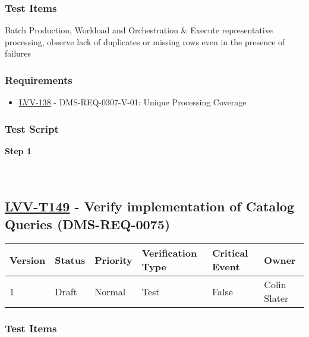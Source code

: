 \hypertarget{test-items-124}{%
\subsubsection{Test Items}\label{test-items-124}}

Batch Production, Workload and Orchestration \& Execute representative
processing, observe lack of duplicates or missing rows even in the
presence of failures

\hypertarget{requirements-125}{%
\subsubsection{Requirements}\label{requirements-125}}

\begin{itemize}
\tightlist
\item
  \href{https://jira.lsstcorp.org/browse/LVV-138}{LVV-138} -
  DMS-REQ-0307-V-01: Unique Processing Coverage
\end{itemize}

\hypertarget{test-script-125}{%
\subsubsection{Test Script}\label{test-script-125}}

\textbf{Step 1}\\
~\\
~\\

\hypertarget{lvv-t149---verify-implementation-of-catalog-queries-dms-req-0075}{%
\subsection{\texorpdfstring{\href{https://jira.lsstcorp.org/secure/Tests.jspa\#/testCase/LVV-T149}{LVV-T149}
- Verify implementation of Catalog Queries
(DMS-REQ-0075)}{LVV-T149 - Verify implementation of Catalog Queries (DMS-REQ-0075)}}\label{lvv-t149---verify-implementation-of-catalog-queries-dms-req-0075}}

\begin{longtable}[]{@{}llllll@{}}
\toprule
Version & Status & Priority & Verification Type & Critical Event &
Owner\tabularnewline
\midrule
\endhead
1 & Draft & Normal & Test & False & Colin Slater\tabularnewline
\bottomrule
\end{longtable}

\hypertarget{test-items-125}{%
\subsubsection{Test Items}\label{test-items-125}}

